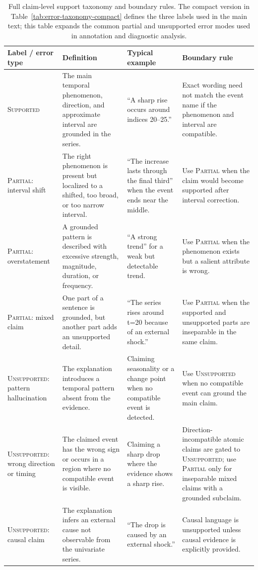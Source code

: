 \begin{table}[!tbp]
\centering
\small
\begin{tabular}{@{}p{}p{}p{}p{}@{}}
\toprule
Label / error type & Definition & Typical example & Boundary rule \\
\midrule
\textsc{Supported} & The main temporal phenomenon, direction, and approximate interval are grounded in the series. & ``A sharp rise occurs around indices 20--25.'' & Exact wording need not match the event name if the phenomenon and interval are compatible. \\
\textsc{Partial}: interval shift & The right phenomenon is present but localized to a shifted, too broad, or too narrow interval. & ``The increase lasts through the final third'' when the event ends near the middle. & Use \textsc{Partial} when the claim would become supported after interval correction. \\
\textsc{Partial}: overstatement & A grounded pattern is described with excessive strength, magnitude, duration, or frequency. & ``A strong trend'' for a weak but detectable trend. & Use \textsc{Partial} when the phenomenon exists but a salient attribute is wrong. \\
\textsc{Partial}: mixed claim & One part of a sentence is grounded, but another part adds an unsupported detail. & ``The series rises around t=20 because of an external shock.'' & Use \textsc{Partial} when the supported and unsupported parts are inseparable in the same claim. \\
\textsc{Unsupported}: pattern hallucination & The explanation introduces a temporal pattern absent from the evidence. & Claiming seasonality or a change point when no compatible event is detected. & Use \textsc{Unsupported} when no compatible event can ground the main claim. \\
\textsc{Unsupported}: wrong direction or timing & The claimed event has the wrong sign or occurs in a region where no compatible event is visible. & Claiming a sharp drop where the evidence shows a sharp rise. & Direction-incompatible atomic claims are gated to \textsc{Unsupported}; use \textsc{Partial} only for inseparable mixed claims with a grounded subclaim. \\
\textsc{Unsupported}: causal claim & The explanation infers an external cause not observable from the univariate series. & ``The drop is caused by an external shock.'' & Causal language is unsupported unless causal evidence is explicitly provided. \\
\bottomrule
\end{tabular}
\caption{Full claim-level support taxonomy and boundary rules. The compact version in Table~\ref{tab:error-taxonomy-compact} defines the three labels used in the main text; this table expands the common partial and unsupported error modes used in annotation and diagnostic analysis.}
\label{tab:error-taxonomy-full}
\end{table}
